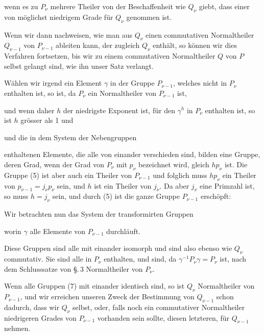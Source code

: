
wenn es zu $P_\nu$ mehrere Theiler von der Beschaffenheit wie $Q_\nu$
giebt, dass einer von möglichst niedrigem Grade für $Q_\nu$ genommen
 ist.

Wenn wir dann nachweisen, wie man aus $Q_\nu$ einen commutativen
 Normaltheiler $Q_{\nu-1}$ von $P_{\nu-1}$ ableiten kann, der zugleich
 $Q_\nu$ enthält, so können wir dies Verfahren fortsetzen, bis
wir zu einem commutativen Normaltheiler $Q$ von $P$ selbst gelangt
 sind, wie ihn unser Satz verlangt.

Wählen wir irgend ein Element $\gamma$ in der Gruppe $P_{\nu-1}$,
welches nicht in $P_\nu$ enthalten ist, so ist, da $P_\nu$ ein Normaltheiler
von $P_{\nu-1}$ ist,


und wenn daher $h$ der niedrigste Exponent ist, für den $\gamma^h$ in
$P_\nu$ enthalten ist, so ist $h$ grösser als 1 und


und die in dem System der Nebengruppen


enthaltenen Elemente, die alle von einander verschieden sind,
bilden eine Gruppe, deren Grad, wenn der Grad von $P_\nu$ mit $p_\nu$
bezeichnet wird, gleich $h p_\nu$ ist. Die Gruppe (5) ist aber auch
ein Theiler von $P_{\nu-1}$ und folglich muss $h p_\nu$ ein Theiler von
$p_{\nu-1} = j_\nu p_\nu$ sein, und $h$ ist ein Theiler von $j_\nu$. Da aber $j_\nu$
eine Primzahl ist, so muss $h = j_\nu$ sein, und durch (5) ist die
ganze Gruppe $P_{\nu-1}$ erschöpft:


Wir betrachten nun das System der transformirten Gruppen


worin $\gamma$ alle Elemente von $P_{\nu-1}$ durchläuft.

Diese Gruppen sind alle mit einander isomorph und sind
also ebenso wie $Q_\nu$ commutativ. Sie sind alle in $P_\nu$ enthalten,
und sind, da $\gamma^{-1} P_\nu \gamma = P_\nu$ ist, nach dem Schlusssatze von \S.\,3
Normaltheiler von $P_\nu$.

Wenn alle Gruppen (7) mit einander identisch sind, so ist
$Q_\nu$ Normaltheiler von $P_{\nu-1}$, und wir erreichen unseren Zweck
der Bestimmung von $Q_{\nu-1}$ schon dadurch, dass wir $Q_\nu$ selbst,
oder, falls noch ein commutativer Normaltheiler niedrigeren
Grades von $P_{\nu-1}$ vorhanden sein sollte, diesen letzteren, für $Q_{\nu-1}$
nehmen.
